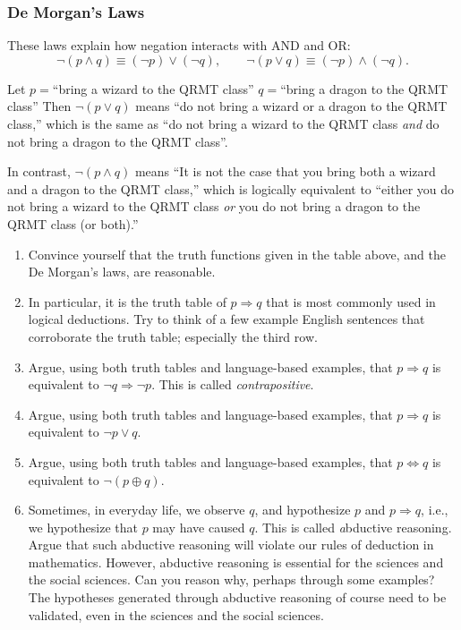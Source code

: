 \subsubsection{De Morgan’s Laws}
These laws explain how negation interacts with AND and OR:
\[
\lnot(p \land q) \equiv (\lnot p) \lor (\lnot q), 
\qquad
\lnot(p \lor q) \equiv (\lnot p) \land (\lnot q).
\]

\begin{example} 
Let $p=$``bring a wizard to the QRMT class'' $q=$``bring a dragon to the QRMT class''  
Then $\lnot(p \lor q)$ means ``do not bring a wizard or a dragon to the QRMT class,''  
which is the same as ``do not bring a wizard to the QRMT class {\em and} do not bring a dragon to the QRMT class''.
\end{example}
\begin{example}
In contrast,  $\lnot(p \land q)$  means  ``It is not the case that you bring both a wizard and a dragon to the QRMT class,'' which is logically equivalent to ``either you do not bring a wizard to the QRMT class \emph{or} you do not bring a dragon to the QRMT class (or both).''
\end{example}

\begin{exercise}
\begin{enumerate}
\item Convince yourself that the truth functions given in the table above, and the De Morgan's laws, are reasonable.
\item In particular, it is the truth table of $p \Rightarrow q$ that is most commonly used in logical deductions. Try to think of a few example English sentences that corroborate the truth table; especially the third row.
\item Argue, using both truth tables and language-based examples, that $p \Rightarrow q$ is equivalent to $\lnot q \Rightarrow \lnot p$. This is called {\em contrapositive}.
\item Argue, using both truth tables and language-based examples, that $p \Rightarrow q$ is equivalent to $\lnot p \lor q$.
\item Argue, using both truth tables and language-based examples, that $p \Leftrightarrow q$ is equivalent to $\lnot (p \oplus q)$.
\item Sometimes, in everyday life, we observe $q$, and hypothesize $p$ and $p \Rightarrow q$, i.e., we hypothesize that $p$ may have caused $q$. This is called {\emph abductive reasoning}.  Argue that such abductive reasoning will violate our rules of deduction in mathematics. However, abductive reasoning is essential for the sciences and the social sciences. Can you reason why, perhaps through some examples? The hypotheses generated through abductive reasoning of course need to be validated, even in the sciences and the social sciences.
\end{enumerate}
\label{exer:truthexers}
\end{exercise}

